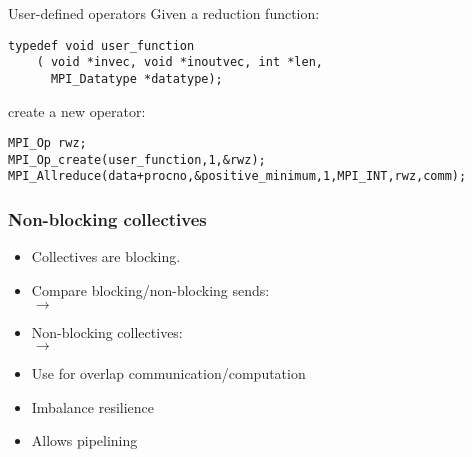 
\begin{mpitwo}
\begin{frame}[containsverbatim]{User-defined operators}
\lstset{language=C}
Given a reduction function:
\begin{lstlisting}
typedef void user_function
    ( void *invec, void *inoutvec, int *len, 
      MPI_Datatype *datatype); 
\end{lstlisting}  
create a new operator:
\begin{lstlisting}
MPI_Op rwz;
MPI_Op_create(user_function,1,&rwz);
MPI_Allreduce(data+procno,&positive_minimum,1,MPI_INT,rwz,comm);
\end{lstlisting}
\end{frame}

\begin{exerciseframe}[onenorm]
  
\end{exerciseframe}
\end{mpitwo}


\begin{frame}[containsverbatim]\frametitle{Non-blocking collectives}
  \label{sl:coll-nonblock-intro}
  \begin{itemize}
  \item Collectives are blocking.
  \item Compare blocking/non-blocking sends:\\
     $\rightarrow$ 
  \item Non-blocking collectives:\\
     $\rightarrow$ 
  \item Use for overlap communication/computation
  \item Imbalance resilience
  \item Allows pipelining
  \end{itemize}
\end{frame}

